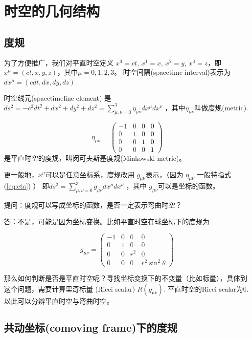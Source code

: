 \documentclass[12pt]{ctexart}
\begin{document}
\section{时空的几何结构}
\subsection{度规}
为了方便推广，我们对平直时空定义 $x^0=ct$, $x^1 = x$, $x^2=y$, $x^3=z$，即$x^\mu=(ct,x,y,z)$，其中$\mu = 0,1,2,3$。
时空间隔(spacetime interval)表示为 $dx^\mu=(cdt,dx,dy,dz)$.

时空线元(spacetimeline element) 是$ds^2=-c^2dt^2 + dx^2 + dy^2 + dz^2=\sum_{\mu,\nu=0}^3 \eta_{\mu \nu}dx^\mu dx^\nu$ ，其中$\eta_{\mu\nu}$叫做度规(metric).

\begin{equation} \label{eq:eta}
    \eta_{\mu\nu} = \left(\begin{array}{llll}-1 & 0 & 0 & 0 \\ 0 & 1 & 0 & 0 \\ 0& 0& 1 &0 \\ 0 & 0&0&1\end{array}\right)
\end{equation}
是平直时空的度规，叫闵可夫斯基度规(Minkowski metric)。

更一般地，$x^\mu$可以是任意坐标系，度规改用  $g_{\mu \nu}$表示，（因为 $\eta_{\mu\nu}$ 一般特指式(\ref{eq:eta}) ）
即$ds^2=\sum_{\mu,\nu=0}^3g_{\mu \nu}dx^\mu dx^\nu$ ，其中 $g_{\mu \nu}$可以是坐标的函数。 

提问：度规可以写成坐标的函数，是否一定表示弯曲时空？
\par 答：不是，可能是因为坐标变换。比如平直时空在球坐标下的度规为

$$g_{\mu\nu} = \left(\begin{array}{llll}-1 & 0 & 0 & 0 \\ 0 & 1 & 0 & 0 \\ 0& 0& r^2 &0 \\ 0 & 0&0& r^2 \sin^2 \theta\end{array}\right)$$

那么如何判断是否是平直时空呢？寻找坐标变换下的不变量（比如标量），具体到这个问题，需要计算里奇标量 (Ricci scalar) $R(g_{\mu\nu})$. 平直时空的Ricci scalar为0. 以此可以分辨平直时空与弯曲时空。 

\subsection{共动坐标(comoving frame)下的度规}
\end{document}
